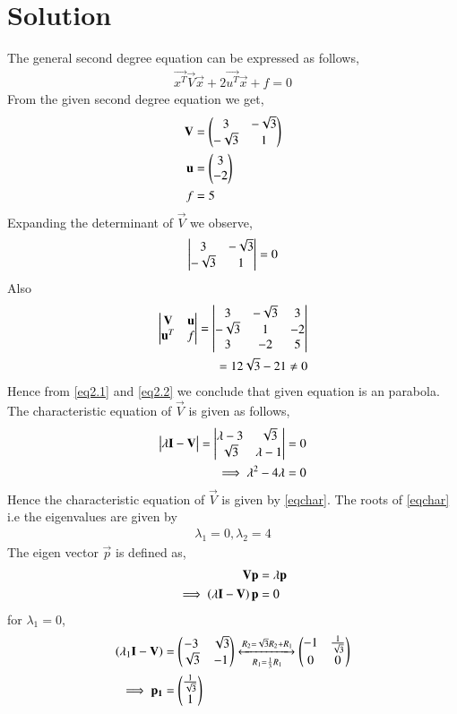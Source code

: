 \documentclass[journal,12pt,twocolumn]{IEEEtran}
\begin{document}
\section{Solution}
The general second degree equation can be expressed as follows,
\begin{align}
\vec{x^T}\vec{V}\vec{x}+2\vec{u^T}\vec{x}+f=0\label{eqmain}
\end{align}
From the given second degree equation we get,
\begin{align}
\mathbf{V} &= \begin{pmatrix}3&-\sqrt{3}\\-\sqrt{3}&1\end{pmatrix}\\
\mathbf{u} &= \begin{pmatrix}3\\-2\end{pmatrix}\\
f &= 5
\end{align}
Expanding the determinant of $\vec{V}$ we observe, 
\begin{align}
\begin{vmatrix}3&-\sqrt{3}\\-\sqrt{3}&1\end{vmatrix} = 0 \label{eq2.1}
\end{align}
Also
\begin{align}
    \begin{vmatrix}\mathbf{V} & \mathbf{u} \\ \mathbf{u}^T & f\end{vmatrix}=
    \begin{vmatrix}3 &-\sqrt{3} & 3 \\ -\sqrt{3}&1 & -2 \\ 3 & -2 & 5\end{vmatrix} \\
    = 12\sqrt{3}-21\neq 0\label{eq2.2}
\end{align}
Hence from \eqref{eq2.1} and \eqref{eq2.2} we conclude that given equation is an parabola. The characteristic equation of $\vec{V}$ is given as follows,
\begin{align}
\begin{vmatrix}\lambda\mathbf{I}-\mathbf{V}\end{vmatrix} = \begin{vmatrix}\lambda-3&\sqrt{3}\\\sqrt{3}&\lambda-1\end{vmatrix} &= 0\\
\implies \lambda^2-4\lambda &= 0\label{eqchar}
\end{align}
Hence the characteristic equation of $\vec{V}$ is given by \eqref{eqchar}. The roots of \eqref{eqchar} i.e the eigenvalues are given by
\begin{align}
\lambda_1=0, \lambda_2=4\label{eqeigenvals}    
\end{align}
The eigen vector $\vec{p}$ is defined as, 
\begin{align}
\mathbf{V}\mathbf{p} &= \lambda\mathbf{p}\\
\implies\left(\lambda\mathbf{I}-\mathbf{V}\right)\mathbf{p}&=0
\end{align}
for $\lambda_1=0$,
\begin{align}
\left(\lambda_1\mathbf{I}-\mathbf{V}\right)&=\begin{pmatrix}-3&\sqrt{3}\\\sqrt{3}&-1\end{pmatrix}\xleftrightarrow[R_1=\frac{1}{3}R_1]{R_2=\sqrt{3}R_2+R_1}\begin{pmatrix}-1&\frac{1}{\sqrt{3}}\\0&0\end{pmatrix}\\
\implies\mathbf{p_1}&=\begin{pmatrix}\frac{1}{\sqrt{3}}\\1\end{pmatrix}
\end{align}
\end{document}

